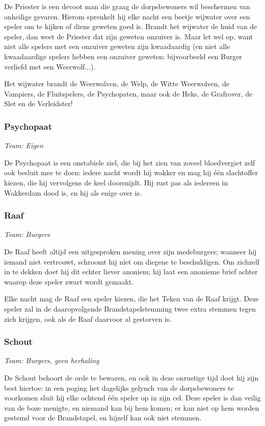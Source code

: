\documentclass[12pt]{article}
\begin{document}
      De Priester is een devoot man die graag de dorpsbewoners wil beschermen van onheilige gevaren. Hierom sprenkelt hij elke nacht een beetje wijwater over een speler om te kijken of diens geweten goed is. Brandt het wijwater de huid van de speler, dan weet de Priester dat zijn geweten onzuiver is. Maar let wel op, want niet alle spelers met een onzuiver geweten zijn kwaadaardig (en niet alle kwaadaardige spelers hebben een onzuiver geweten: bijvoorbeeld een Burger verliefd met een Weerwolf...). 
    
      Het wijwater brandt de Weerwolven, de Welp, de Witte Weerwolven, de Vampiers, de Fluitspelers, de Psychopaten, maar ook de Heks, de Grafrover, de Slet en de Verleidster!
    
    \subsubsection{Psychopaat}
      \emph{\scriptsize Team: Eigen}
    
      De Psychopaat is een onstabiele ziel, die bij het zien van zoveel bloedvergiet zelf ook besluit mee te doen: iedere nacht wordt hij wakker en mag hij \'e\'en slachtoffer kiezen, die hij vervolgens de keel doorsnijdt. Hij rust pas als iedereen in Wakkerdam dood is, en hij als enige over is.
    
    \subsubsection{Raaf}
      \emph{\scriptsize Team: Burgers}
    
      De Raaf heeft altijd een uitgesproken mening over zijn medeburgers; wanneer hij iemand niet vertrouwt, schroomt hij niet om diegene te beschuldigen. Om zichzelf in te dekken doet hij dit echter liever anoniem; hij laat een anonieme brief achter waarop deze speler zwart wordt gemaakt.
    
      Elke nacht mag de Raaf een speler kiezen, die het Teken van de Raaf krijgt. Deze speler zal in de daaropvolgende Brandstapelstemming twee extra stemmen tegen zich krijgen, ook als de Raaf daarvoor al gestorven is.

    \subsubsection{Schout}
      \emph{\scriptsize Team: Burgers, geen herhaling}
    
      De Schout behoort de orde te bewaren, en ook in deze onrustige tijd doet hij zijn best hiertoe: in een poging het dagelijks gelynch van de dorpsbewoners te voorkomen sluit hij elke ochtend \'e\'en speler op in zijn cel. Deze speler is dan veilig van de boze menigte, en niemand kan bij hem komen; er kan niet op hem worden gestemd voor de Brandstapel, en hijzelf kan ook niet stemmen.
    
\end{document}
